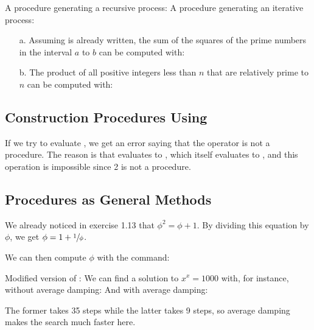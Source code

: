 \begin{exe}[1.33]
    A  procedure generating a recursive process:
    A  procedure generating an iterative process:
    \begin{itemize}
        \item[a.] Assuming  is already written, the sum of the 
            squares of the prime numbers in the interval $a$ to $b$ can be 
            computed with:
        \item[b.] The product of all positive integers less than $n$ that are 
            relatively prime to $n$ can be computed with:
    \end{itemize}
\end{exe}

\subsection{Construction Procedures Using }

\begin{exe}[1.34]
    If we try to evaluate , we get an error saying that the operator 
    is not a procedure. The reason is that  evaluates to
    , which itself evaluates to , and this operation is 
    impossible since 2 is not a procedure.
\end{exe}

\subsection{Procedures as General Methods}

\begin{exe}[1.35]
    We already noticed in exercise 1.13 that $\phi^2 = \phi + 1$. By dividing 
    this equation by $\phi$, we get $\phi = 1 + \sfrac{1}{\phi}$.

    We can then compute $\phi$ with the command:
\end{exe}

\begin{exe}[1.36]
    Modified version of :
    We can find a solution to $x^x = 1000$ with, for instance, without average 
    damping:
    And with average damping:

    The former takes 35 steps while the latter takes 9 steps, so average damping 
    makes the search much faster here.
\end{exe}

